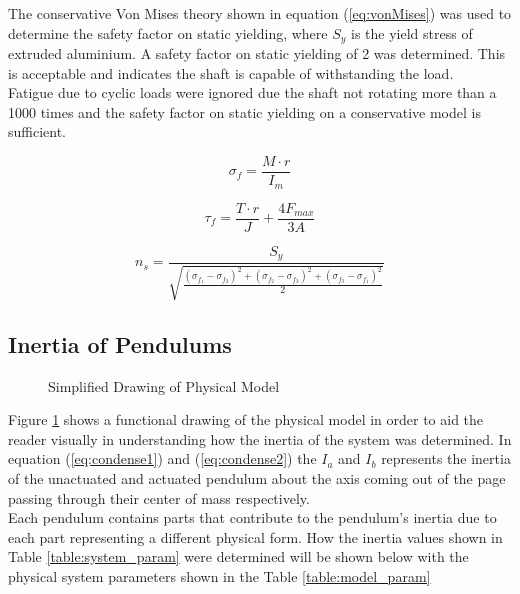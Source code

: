 The conservative Von Mises theory shown in equation (\ref{eq:vonMises}) was used to determine the safety factor on static yielding, where $S_{y}$ is the yield stress of extruded aluminium. A safety factor on static yielding of 2 was determined. This is acceptable and indicates the shaft is capable of withstanding the load.\\

Fatigue due to cyclic loads were ignored due the shaft not rotating more than a 1000 times and the safety factor on static yielding  on a conservative model is sufficient.

\begin{equation} \label{eq:axialForce}
\sigma_{f} = \frac{M\cdot r}{I_{m}}
\end{equation}

\begin{equation} \label{eq:torsionForce}
\tau_{f} = \frac{T\cdot r}{J} + \frac{4F_{max}}{3A}
\end{equation}


\begin{equation} \label{eq:vonMises}
n_{s} = \frac{S_{y}}{\sqrt{\frac{(\sigma_{f_{1}}-\sigma_{f_{2}})^2+(\sigma_{f_{2}}-\sigma_{f_{3}})^2+(\sigma_{f_{3}}-\sigma_{f_{1}})^2}{2}}}
\end{equation}

\subsection{Inertia of Pendulums}
\begin{figure}[h]
	\centering
	
	\caption{Simplified Drawing of Physical Model}
	\label{fig:model_drawing}
\end{figure}

Figure \ref{fig:model_drawing} shows a functional drawing of the physical model in order to aid the reader visually in understanding how the inertia of the system was determined. In equation (\ref{eq:condense1}) and (\ref{eq:condense2}) the $I_{a}$ and $I_{b}$ represents the inertia of the unactuated and actuated pendulum about the axis coming out of the page passing through their center of mass respectively.\\

Each pendulum contains parts that contribute to the pendulum's inertia due to each part representing a different physical form. How the inertia values shown in Table \ref{table:system_param} were determined will be shown below with the physical system parameters shown in the Table \ref{table:model_param}\\

